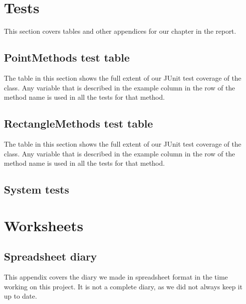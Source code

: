\appendix
\addappheadtotoc
\chapter{Tests}
This section covers tables and other appendices for our  chapter in
the report.
\section{PointMethods test table}
\label{APP-TE-PM}
The table in this section shows the full extent of our JUnit test coverage of
the  class. Any variable that is described in the
example column in the row of the method name is used in all the tests for that
method.



\section{RectangleMethods test table}
\label{APP-TE-RM}
The table in this section shows the full extent of our JUnit test coverage of
the  class. Any variable that is described in the
example column in the row of the method name is used in all the tests for that
method.



\section{System tests}

\chapter{Worksheets}
\label{APP-WS}

\section{Spreadsheet diary}
\label{APP-SS}
This appendix covers the diary we made in spreadsheet format in the time working
on this project. It is not a complete diary, as we did not always keep it up to
date. 

